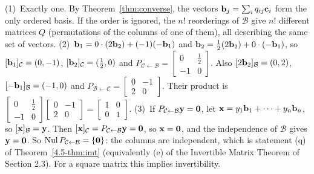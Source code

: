 \documentclass[11pt]{article}
\begin{document}
\begin{description}[leftmargin=0pt,itemsep=5pt]
  \item[Questions to think about.] (1)~Exactly one. By Theorem~\ref{thm:converse}, the vectors $\mathbf{b}_j=\sum_iq_{ij}\mathbf{c}_i$ form the only ordered basis. If the order is ignored, the $n!$ reorderings of $\mathcal{B}$ give $n!$ different matrices $Q$ (permutations of the columns of one of them), all describing the same set of vectors. (2)~$\mathbf{b}_1=0\cdot(2\mathbf{b}_2)+(-1)(-\mathbf{b}_1)$ and $\mathbf{b}_2=\tfrac12(2\mathbf{b}_2)+0\cdot(-\mathbf{b}_1)$, so $[\mathbf{b}_1]_{\mathcal{C}}=(0,-1)$, $[\mathbf{b}_2]_{\mathcal{C}}=(\tfrac12,0)$ and $P_{\mathcal{C}\leftarrow\mathcal{B}}=\begin{bmatrix}0&\tfrac12\\-1&0\end{bmatrix}$. Also $[2\mathbf{b}_2]_{\mathcal{B}}=(0,2)$, $[-\mathbf{b}_1]_{\mathcal{B}}=(-1,0)$ and $P_{\mathcal{B}\leftarrow\mathcal{C}}=\begin{bmatrix}0&-1\\2&0\end{bmatrix}$. Their product is $\begin{bmatrix}0&\tfrac12\\-1&0\end{bmatrix}\begin{bmatrix}0&-1\\2&0\end{bmatrix}=\begin{bmatrix}1&0\\0&1\end{bmatrix}$. (3)~If $P_{\mathcal{C}\leftarrow\mathcal{B}}\mathbf{y}=\mathbf{0}$, let $\mathbf{x}=y_1\mathbf{b}_1+\cdots+y_n\mathbf{b}_n$, so $[\mathbf{x}]_{\mathcal{B}}=\mathbf{y}$. Then $[\mathbf{x}]_{\mathcal{C}}=P_{\mathcal{C}\leftarrow\mathcal{B}}\mathbf{y}=\mathbf{0}$, so $\mathbf{x}=\mathbf{0}$, and the independence of $\mathcal{B}$ gives $\mathbf{y}=\mathbf{0}$. So $\operatorname{Nul} P_{\mathcal{C}\leftarrow\mathcal{B}}=\{\mathbf{0}\}$: the columns are independent, which is statement (q) of Theorem~\ref{4.5-thm:imt} (equivalently (e) of the Invertible Matrix Theorem of Section 2.3). For a square matrix this implies invertibility.
\end{description}
\end{document}
